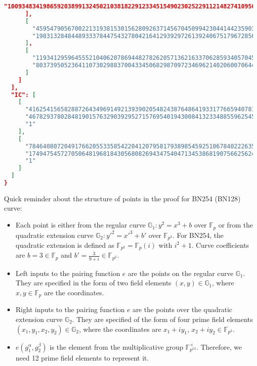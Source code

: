 \documentclass[../lecture-notes.tex]{subfiles}
\begin{document}
\begin{lstlisting}[language=JSON,numbers=none,basicstyle=\footnotesize\ttfamily\tiny]
        "10093483419865920389913245021038182291233451549023025229112148274109565435465"
      ],
      [
        "4595479056700221319381530156280926371456704509942304414423590385166031118820",
        "19831328484489333784475432780421641293929726139240675179672856274388269393268"
      ],
      [
        "11934129596455521040620786944827826205713621633706285934057045369193958244500",
        "8037395052364110730298837004334506829870972346962140206007064471173334027475"
      ]
    ]
  ],
  "IC": [
    [
      "4162541565828872643496914921393902054824387648641933177665940781539334781623",
      "4678293780284819015763290392952715769540194300841323348855962545628746384938",
      "1"
    ],
    [
      "7846408072049176620553358542204120795817938985459251067840222635524693287955",
      "17494754572705064819681843056808269434754047134538681907566256240907807975850",
      "1"
    ]
  ]
}
    \end{lstlisting}

    \vspace{0.5cm}

    Quick reminder about the structure of points in the proof for BN254 (BN128) curve:
    \begin{itemize}
        \item Each point is either from the regular curve $\mathbb{G}_1: y^2=x^3+b$ over $\mathbb{F}_p$ or from the quadratic extension curve $\mathbb{G}_2: y'^2=x'^3+b'$ over $\mathbb{F}_{p^2}$. For BN254, the quadratic extension is defined as $\mathbb{F}_{p^2} = \mathbb{F}_p(i)$ with $i^2+1$. Curve coefficients are $b=3 \in \mathbb{F}_p$ and $b'=\frac{3}{9+i} \in \mathbb{F}_{p^2}$.
        \item Left inputs to the pairing function $e$ are the points on the regular curve $\mathbb{G}_1$. They are specified in the form of two field elements $(x,y) \in \mathbb{G}_1$, where $x, y \in \mathbb{F}_p$ are the coordinates.
        \item Right inputs to the pairing function $e$ are the points over the quadratic extension curve $\mathbb{G}_2$. They are specified of the form of four prime field elements $(x_{1}, y_{1}, x_{2}, y_2) \in \mathbb{G}_2$, where the coordinates are $x_1+iy_1$, $x_2+iy_2 \in \mathbb{F}_{p^2}$.
        \item $e(g_1^{\alpha}, g_2^{\beta})$ is the element from the multiplicative group $\mathbb{F}_{p^{12}}^{\times}$. Therefore, we need 12 prime field elements to represent it.
    \end{itemize}
\end{document}
